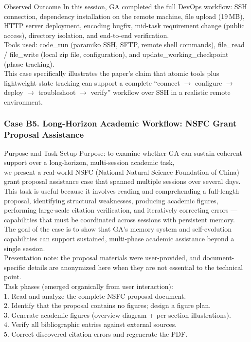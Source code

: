 \begin{CaseAnswerBox}{Observed Outcome}
\small\ttfamily
In this session, GA completed the full DevOps workflow: SSH connection, dependency installation on the remote machine, file upload (19\,MB), HTTP server deployment, encoding bugfix, mid-task requirement change (public access), directory isolation, and end-to-end verification. \\
Tools used: code\_run (paramiko SSH, SFTP, remote shell commands), file\_read / file\_write (local zip file, configuration), and update\_working\_checkpoint (phase tracking). \\
This case specifically illustrates the paper's claim that atomic tools plus lightweight state tracking can support a complete ``connect $\rightarrow$ configure $\rightarrow$ deploy $\rightarrow$ troubleshoot $\rightarrow$ verify'' workflow over SSH in a realistic remote environment.
\end{CaseAnswerBox}

\FloatBarrier

\subsubsection{Case B5. Long-Horizon Academic Workflow: NSFC Grant Proposal Assistance}
\label{app:case_academic}

\begin{CasePromptBox}{Purpose and Task Setup}
\small\ttfamily
Purpose: to examine whether GA can sustain coherent support over a long-horizon, multi-session academic task, \\
we present a real-world NSFC (National Natural Science Foundation of China) grant proposal assistance case that spanned multiple sessions over several days. \\
This task is useful because it involves reading and comprehending a full-length proposal, identifying structural weaknesses, producing academic figures, performing large-scale citation verification, and iteratively correcting errors --- capabilities that must be coordinated across sessions with persistent memory. \\
The goal of the case is to show that GA's memory system and self-evolution capabilities can support sustained, multi-phase academic assistance beyond a single session. \\[6pt]
Presentation note: the proposal materials were user-provided, and document-specific details are anonymized here when they are not essential to the technical point. \\
Task phases (emerged organically from user interaction): \\
1. Read and analyze the complete NSFC proposal document. \\
2. Identify that the proposal contains no figures; design a figure plan. \\
3. Generate academic figures (overview diagram + per-section illustrations). \\
4. Verify all bibliographic entries against external sources. \\
5. Correct discovered citation errors and regenerate the PDF.
\end{CasePromptBox}

